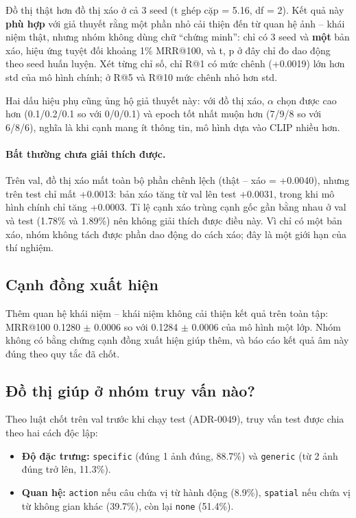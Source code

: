 \documentclass[12pt, a4paper]{article}
\makeatletter
\newcommand{\code}[1]{\texttt{#1}}
\newcommand{\mrr}{MRR@100}
\newcommand{\pmm}{\ensuremath{\pm}}
\makeatother
\begin{document}
Đồ thị thật hơn đồ thị xáo ở cả 3 seed (t ghép cặp = 5.16, df = 2). Kết quả này \textbf{phù hợp} với giả thuyết rằng một phần nhỏ cải thiện đến từ quan hệ ảnh -- khái niệm thật, nhưng nhóm không dùng chữ ``chứng minh'': chỉ có 3 seed và \textbf{một} bản xáo, hiệu ứng tuyệt đối khoảng 1\% \mrr, và t, p ở đây chỉ đo dao động theo seed huấn luyện. Xét từng chỉ số, chỉ R@1 có mức chênh (+0.0019) lớn hơn std của mô hình chính; ở R@5 và R@10 mức chênh nhỏ hơn std.

Hai dấu hiệu phụ cũng ủng hộ giả thuyết này: với đồ thị xáo, $\alpha$ chọn được cao hơn (0.1/0.2/0.1 so với 0/0/0.1) và epoch tốt nhất muộn hơn (7/9/8 so với 6/8/6), nghĩa là khi cạnh mang ít thông tin, mô hình dựa vào CLIP nhiều hơn.

\paragraph{Bất thường chưa giải thích được.} Trên val, đồ thị xáo mất toàn bộ phần chênh lệch (thật -- xáo = +0.0040), nhưng trên test chỉ mất +0.0013: bản xáo tăng từ val lên test +0.0031, trong khi mô hình chính chỉ tăng +0.0003. Tỉ lệ cạnh xáo trùng cạnh gốc gần bằng nhau ở val và test (1.78\% và 1.89\%) nên không giải thích được điều này. Vì chỉ có một bản xáo, nhóm không tách được phần dao động do cách xáo; đây là một giới hạn của thí nghiệm.

\subsection{Cạnh đồng xuất hiện}
Thêm quan hệ khái niệm -- khái niệm không cải thiện kết quả trên toàn tập: \mrr{} 0.1280 \pmm{} 0.0006 so với 0.1284 \pmm{} 0.0006 của mô hình một lớp. Nhóm không có bằng chứng cạnh đồng xuất hiện giúp thêm, và báo cáo kết quả âm này đúng theo quy tắc đã chốt.

\subsection{Đồ thị giúp ở nhóm truy vấn nào?}
Theo luật chốt trên val trước khi chạy test (ADR-0049), truy vấn test được chia theo hai cách độc lập:
\begin{itemize}
\item \textbf{Độ đặc trưng:} \code{specific} (đúng 1 ảnh đúng, 88.7\%) và \code{generic} (từ 2 ảnh đúng trở lên, 11.3\%).
\item \textbf{Quan hệ:} \code{action} nếu câu chứa vị từ hành động (8.9\%), \code{spatial} nếu chứa vị từ không gian khác (39.7\%), còn lại \code{none} (51.4\%).
\end{itemize}
\end{document}
